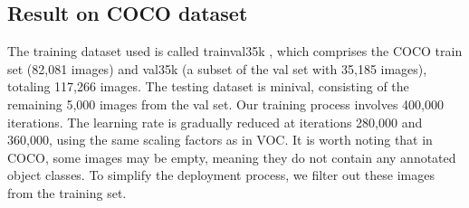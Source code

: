 \documentclass[a4paper]{article}
\begin{document}
	\subsection{Result on COCO dataset}
	The training dataset used is called trainval35k \cite{trainval35k}, which comprises the COCO train set (82,081 images) and val35k (a subset of the val set with 35,185 images), totaling 117,266 images. The testing dataset is minival, consisting of the remaining 5,000 images from the val set. Our training process involves 400,000 iterations. The learning rate is gradually reduced at iterations 280,000 and 360,000, using the same scaling factors as in VOC. It is worth noting that in COCO, some images may be empty, meaning they do not contain any annotated object classes. To simplify the deployment process, we filter out these images from the training set.



\end{document}

